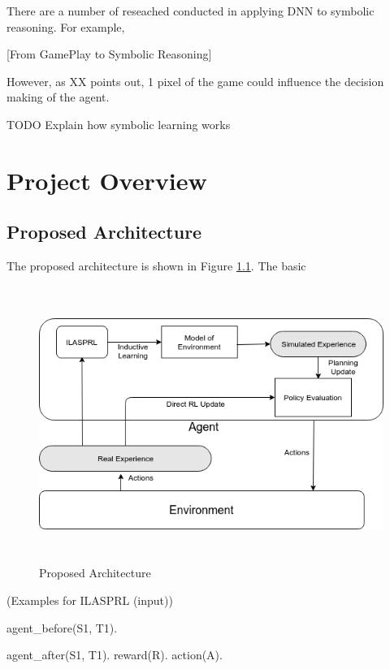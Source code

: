 \documentclass[12pt,twoside]{report}
\begin{document}
There are a number of reseached conducted in applying DNN to symbolic reasoning.
For example,

[From GamePlay to Symbolic Reasoning]


However, as XX points out, 1 pixel of the game could influence the decision making of the agent.


TODO Explain how symbolic learning works


\chapter{Project Overview}

\section{Proposed Architecture}

The proposed architecture is shown in Figure \ref{proposed_architecture}. The basic

\begin{figure}[!htb]
\centering
\includegraphics[width=15cm, height=9cm]{./figures/ILASRL}
\caption{Proposed Architecture}
\label{proposed_architecture}
\end{figure}




\begin{examp} (Examples for ILASPRL (input))

agent\_before(S1, T1).

agent\_after(S1, T1).
reward(R).
action(A).

\end{examp}
\label{examples\_input}
\end{document}
